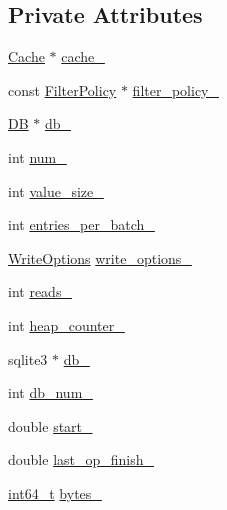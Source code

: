 \subsection*{Private Attributes}
\begin{DoxyCompactItemize}
\item 
\hyperlink{classleveldb_1_1_cache}{Cache} $\ast$ \hyperlink{classleveldb_1_1_benchmark_af051c32dbe15c131de7cd273517b1dfb}{cache\+\_\+}
\item 
const \hyperlink{classleveldb_1_1_filter_policy}{Filter\+Policy} $\ast$ \hyperlink{classleveldb_1_1_benchmark_a805c1ad1596e405c6d5320d618538464}{filter\+\_\+policy\+\_\+}
\item 
\hyperlink{classleveldb_1_1_d_b}{D\+B} $\ast$ \hyperlink{classleveldb_1_1_benchmark_a8583f72650821d4141934eee12b20392}{db\+\_\+}
\item 
int \hyperlink{classleveldb_1_1_benchmark_a26ae7b63ddf6a2836fb807016a588d1c}{num\+\_\+}
\item 
int \hyperlink{classleveldb_1_1_benchmark_a659f2e7f9578b4f8e8adc56da031e193}{value\+\_\+size\+\_\+}
\item 
int \hyperlink{classleveldb_1_1_benchmark_a364560f10183eb31e6c911fd82906843}{entries\+\_\+per\+\_\+batch\+\_\+}
\item 
\hyperlink{structleveldb_1_1_write_options}{Write\+Options} \hyperlink{classleveldb_1_1_benchmark_a0e4811e2580f4777fc4a5c1abb855d62}{write\+\_\+options\+\_\+}
\item 
int \hyperlink{classleveldb_1_1_benchmark_a2e97a6d4ff062a40f1891770b1b54c33}{reads\+\_\+}
\item 
int \hyperlink{classleveldb_1_1_benchmark_a7942968453e5722932880f2f34c00119}{heap\+\_\+counter\+\_\+}
\item 
sqlite3 $\ast$ \hyperlink{classleveldb_1_1_benchmark_a409eeef97e94dddaf33d2185c7dd3ae1}{db\+\_\+}
\item 
int \hyperlink{classleveldb_1_1_benchmark_ae1b5f979a3999e501cbaa1dabf4567c4}{db\+\_\+num\+\_\+}
\item 
double \hyperlink{classleveldb_1_1_benchmark_a626ada583147d77109b593cc8472d1b5}{start\+\_\+}
\item 
double \hyperlink{classleveldb_1_1_benchmark_a407780bf5c322f9f43ad551fbeb1619e}{last\+\_\+op\+\_\+finish\+\_\+}
\item 
\hyperlink{stdint_8h_adec1df1b8b51cb32b77e5b86fff46471}{int64\+\_\+t} \hyperlink{classleveldb_1_1_benchmark_a25cccb81c8110b9976e00af2cc1efc4c}{bytes\+\_\+}
\item 

\end{DoxyCompactItemize}
